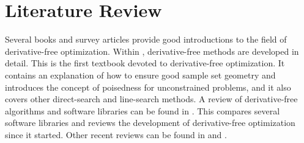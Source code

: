 


\section{Literature Review}

\label{literature_review}








Several books and survey articles  provide good introductions to the field of derivative-free optimization.
Within \cite{introduction_book}, derivative-free methods are developed in detail.
This is the first textbook devoted to derivative-free optimization.
It contains an explanation of how to ensure good sample set geometry and introduces the concept of 
poisedness for unconstrained problems, and it also covers other direct-search and line-search methods.   A review of derivative-free algorithms and software libraries can be found in \cite{miguel_review}.
This compares several software libraries and reviews the development of derivative-free optimization since it started.
Other recent reviews can be found in \cite{custodio_review2} and \cite{larson_menickelly_wild_2019}.


